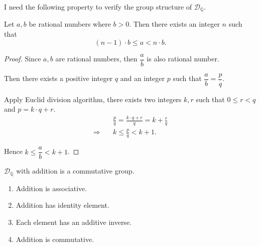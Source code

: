 I need the following property to verify the group structure of $\mathscr{D}_{\mathbb{Q}}$.

\begin{theorem}
    Let $a, b$ be rational numbers where $b > 0$. Then there exists an integer $n$ such that
    \[
        (n - 1)\cdot b \le a < n\cdot b.
    \]
\end{theorem}

\begin{proof}
    Since $a, b$ are rational numbers, then $\dfrac{a}{b}$ is also rational number.

    Then there exists a positive integer $q$ and an integer $p$ such that $\dfrac{a}{b} = \dfrac{p}{q}$.

    Apply Euclid division algorithm, there exists two integers $k, r$ such that $0\le r < q$ and $p = k\cdot q + r$.
    \begin{align*}
                         & \frac{p}{q} = \frac{k\cdot q + r}{q} = k + \frac{r}{q} \\
        \Rightarrow\quad & k \le \frac{p}{q} < k + 1.
    \end{align*}

    Hence $k \le \dfrac{a}{b} < k + 1$.
\end{proof}

\begin{theorem}\label{theorem:chapter1:real-field-part-one}
    $\mathscr{D}_{\mathbb{Q}}$ with addition is a commutative group.
    \begin{enumerate}[label={(F\arabic*)},itemsep=0pt]
        \item Addition is associative.
        \item Addition has identity element.
        \item Each element has an additive inverse.
        \item Addition is commutative.
    \end{enumerate}
\end{theorem}

